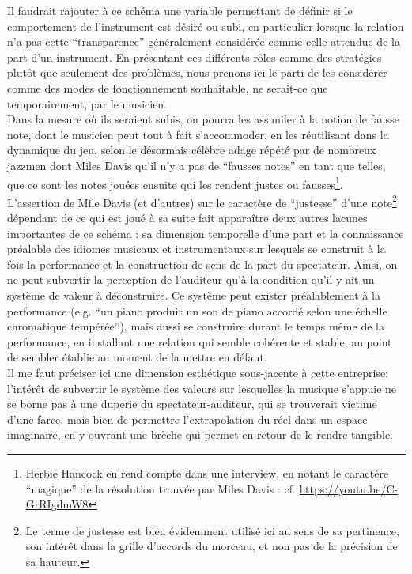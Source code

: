 \indent Il faudrait rajouter à ce schéma une variable permettant de définir si le comportement de l'instrument est désiré ou subi, en particulier lorsque la relation n'a pas cette ``transparence'' généralement considérée comme celle attendue de la part d'un instrument. En présentant ces différents rôles comme des stratégies plutôt que seulement des problèmes, nous prenons ici le parti de les considérer comme des modes de fonctionnement souhaitable, ne serait-ce que temporairement, par le musicien.\\
\indent Dans la mesure où ils seraient subis, on pourra les assimiler à la notion de fausse note, dont le musicien peut tout à fait s'accommoder, en les réutilisant dans la dynamique du jeu, selon le désormais célèbre adage répété par de nombreux jazzmen dont Miles Davis qu'il n'y a pas de ``fausses notes'' en tant que telles, que ce sont les notes jouées ensuite qui les rendent justes ou fausses\footnote{Herbie Hancock en rend compte dans une interview, en notant le caractère ``magique'' de la résolution trouvée par Miles Davis :  cf. \url{https://youtu.be/C-GrRIgdmW8}}.\\
\indent L'assertion de Mile Davis (et d'autres) sur le caractère de ``justesse'' d'une note\footnote{Le terme de justesse est bien évidemment utilisé ici au sens de sa pertinence, son intérêt dans la grille d'accords du morceau, et non pas de la précision de sa hauteur. } dépendant de ce qui est joué à sa suite fait apparaître deux autres lacunes importantes de ce schéma : sa dimension temporelle d'une part et la connaissance préalable des idiomes musicaux et instrumentaux sur lesquels se construit à la fois la performance et la construction de sens de la part du spectateur. Ainsi, on ne peut subvertir la perception de l'auditeur qu'à la condition qu'il y ait un système de valeur à déconstruire. Ce système peut exister préalablement à la performance (e.g. ``un piano produit un son de piano accordé selon une échelle chromatique tempérée''), mais aussi se construire durant le temps même de la performance, en installant une relation qui semble cohérente et stable, au point de sembler établie au moment de la mettre en défaut.\\
\indent Il me faut préciser ici une dimension esthétique sous-jacente à cette entreprise: l'intérêt de subvertir le système des valeurs sur lesquelles la musique s'appuie ne se borne pas à une duperie du spectateur-auditeur, qui se trouverait victime d'une farce, mais bien de permettre l'extrapolation du réel dans un espace imaginaire, en y ouvrant une brèche qui permet en retour de le rendre tangible.

